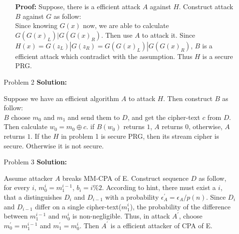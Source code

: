 \normalfont\documentclass[letterpaper,11pt]{article}
\begin{document}
\begin{enumerate}
\begin{enumerate}
			\textbf{Proof:}
			Suppose, there is a efficient attack $A$ against $H$. Construct attack $B$ against $G$ as follow:\\ Since knowing $G(x)$ now, we are able to calculate $G(G(x)_L)|G(G(x)_R)$. Then use $A$ to attack it. Since $H(x) = G(z_L)|G(z_R) = G(G(x)_L)|G(G(x)_R)$, $B$ is a efficient attack which contradict with the assumption. Thus $H$ is a secure PRG.
	\end{enumerate}
\item [Problem 2]\textbf{Solution:}\par
	Suppose we have an efficient algorithm $A$ to attack $H$. Then construct $B$ as follow:\\
	$B$ choose $m_0$ and $m_1$ and send them to $D$, and get the cipher-text $c$ from $D$. Then calculate $w_0 = m_0 \oplus c$. if $B(w_0)$ returns $1$, $A$ returns $0$, otherwise, $A$ returns $1$.
	If the $H$ in problem 1 is secure PRG, then its stream cipher is secure. Otherwise it is not secure.
\item [Problem 3]\textbf{Solution:}\par
	Assume attacker $A$ breaks MM-CPA of E. Construct sequence $D$ as follow, for every $i$, $m_0^i = m_1^{i-1}$, $b_i = i\%2$. According to hint, there must exist a $i$, that a distinguishes $D_i$ and $D_{i-1}$ with a probability $\epsilon^\prime_A = \epsilon_A/p(n)$. Since $D_i$ and $D_{i-1}$ differ on a single cipher-text($m^i_1$), the probability of the difference between $m^{i-1}_1$ and $m^i_0$ is non-negligible. Thus, in attack $A^\prime$, choose $m^\prime_0 = m^{i-1}_1$ and $m^\prime_1 = m^{i}_0$. Then $A^\prime$ is a efficient attacker of CPA of E. 
\end{enumerate}
\end{document}
